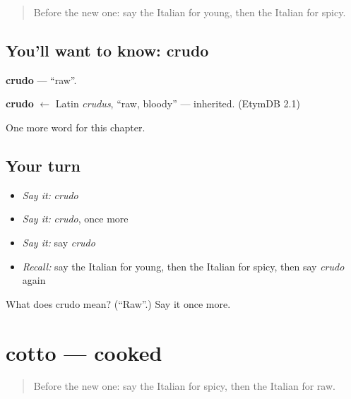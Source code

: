 \label{lesson:IT-C246-crudo}



\begin{quote}
Before the new one: say the Italian for young, then the Italian for spicy.
\end{quote}

\subsection*{You'll want to know: crudo}
\textbf{crudo} — \textquotedblleft{}raw\textquotedblright{}.

\begin{cousinweb}
\textbf{crudo} $\leftarrow$ Latin \emph{crudus}, \textquotedblleft{}raw, bloody\textquotedblright{} — inherited. (EtymDB 2.1)
\end{cousinweb}

\begin{grammarlens}[title={What you've built}]
One more word for this chapter.
\end{grammarlens}

\subsection*{Your turn}
\begin{itemize}
\raggedright
  \item \emph{Say it:} \emph{crudo}
  \item \emph{Say it:} \emph{crudo}, once more
  \item \emph{Say it:} say \emph{crudo}
  \item \emph{Recall:} say the Italian for young, then the Italian for spicy, then say \emph{crudo} again
\end{itemize}

\begin{tcolorbox}[breakable,colback=teal!4,colframe=teal!35!black,title={Before you move on}]
What does crudo mean? (\textquotedblleft{}Raw\textquotedblright{}.) Say it once more.
\end{tcolorbox}
\section[cotto]{cotto — cooked}

\label{lesson:IT-C246-cotto}



\begin{quote}
Before the new one: say the Italian for spicy, then the Italian for raw.
\end{quote}

